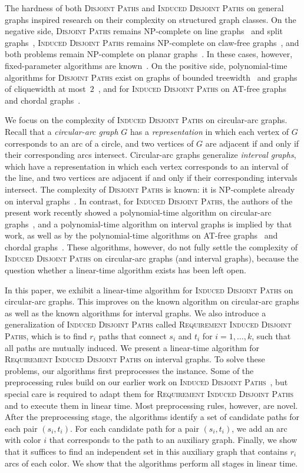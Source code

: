 \documentclass{llncs}
\newcommand{\NP}{{\sf NP}}
\newcommand{\problemIDP}{\textsc{Induced Disjoint Paths}}
\newcommand{\problemRIDP}{\textsc{Requirement Induced Disjoint Paths}}
\newcommand{\problemDP}{\textsc{Disjoint Paths}}
\begin{document}
The hardness of both \problemDP{} and \problemIDP{} on general graphs inspired research on their complexity on structured graph classes. On the negative side, \problemDP{} remains \NP-complete on line graphs~\cite{Ly75} and split graphs~\cite{HvtHSvL2014}, \problemIDP{} remains \NP-complete on claw-free graphs~\cite{FKLP12}, and both problems remain \NP-complete on planar graphs~\cite{KvL84,GPV12}. In these cases, however, fixed-parameter algorithms are known~\cite{GPV12b,HvtHSvL2014,KK12,RRSS93,RS95}. On the positive side, polynomial-time algorithms for \problemDP{} exist on graphs of bounded treewidth~\cite{Reed1997} and graphs of cliquewidth at most~$2$~\cite{GurWan2006}, and for \problemIDP{} on AT-free graphs~\cite{GPV12} and chordal graphs~\cite{BGHHKP12}.

We focus on the complexity of \problemIDP{} on circular-arc graphs. Recall that a \emph{circular-arc graph} $G$ has a \emph{representation} in which each vertex of $G$ corresponds to an arc of a circle, and two vertices of $G$ are adjacent if and only if their corresponding arcs intersect. Circular-arc graphs generalize \emph{interval graphs}, which have a representation in which each vertex corresponds to an interval of the line, and two vertices are adjacent if and only if their corresponding intervals intersect. The complexity of \problemDP{} is known: it is \NP-complete already on interval graphs~\cite{NS1996}. In contrast, for \problemIDP{}, the authors of the present work recently showed a polynomial-time algorithm on circular-arc graphs~\cite{GPV12b}, and a polynomial-time algorithm on interval graphs is implied by that work, as well as by the polynomial-time algorithms on AT-free graphs~\cite{GPV12} and chordal graphs~\cite{BGHHKP12}. These algorithms, however, do not fully settle the complexity of \problemIDP{} on circular-arc graphs (and interval graphs), because the question whether a linear-time algorithm exists has been left open.

In this paper, we exhibit a linear-time algorithm for \problemIDP{} on circular-arc graphs. This improves on the known algorithm on circular-arc graphs as well as the known algorithms for interval graphs. We also introduce a generalization of \problemIDP{} called \problemRIDP{}, which is to find $r_{i}$ paths that connect $s_{i}$ and $t_{i}$ for $i=1,\ldots,k$, such that all paths are mutually induced. We present a linear-time algorithm for \problemRIDP{} on interval graphs. To solve these problems, our algorithms first preprocesses the instance. Some of the preprocessing rules build on our earlier work on \problemIDP{}~\cite{GPV12,GPV12b}, but special care is required to adapt them for \problemRIDP{} and to execute them in linear time. Most preprocessing rules, however, are novel. After the preprocessing stage, the algorithms identify a set of candidate paths for each pair $(s_{i},t_{i})$. For each candidate path for a pair $(s_{i},t_{i})$, we add an arc with color $i$ that corresponds to the path to an auxiliary graph. Finally, we show that it suffices to find an independent set in this auxiliary graph that contains $r_{i}$ arcs of each color. We show that the algorithms perform all stages in linear time.
\end{document}
